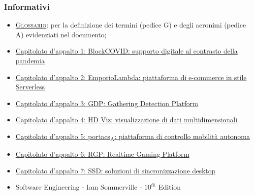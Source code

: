\subsubsection{Informativi}
\begin{itemize}
	\item \textsc{\href{https://github.com/Three-Way-Milkshake/docs/wiki/Glossario}{Glossario}}: per la definizione dei termini (pedice G) e degli acronimi (pedice A) evidenziati nel documento;
	\item \href{https://www.math.unipd.it/~tullio/IS-1/2020/Progetto/C1.pdf}{Capitolato d'appalto 1: BlockCOVID: supporto digitale al contrasto della pandemia}\\
	\item \href{https://www.math.unipd.it/~tullio/IS-1/2020/Progetto/C2.pdf}{Capitolato d'appalto 2: EmporioLambda: piattaforma di e-commerce in stile Serverless}\\
	\item \href{https://www.math.unipd.it/~tullio/IS-1/2020/Progetto/C3.pdf}{Capitolato d'appalto 3: GDP: Gathering Detection Platform}\\
	\item \href{https://www.math.unipd.it/~tullio/IS-1/2020/Progetto/C4.pdf}{Capitolato d'appalto 4: HD Viz: visualizzazione di dati multidimensionali}\\
	\item \href{https://www.math.unipd.it/~tullio/IS-1/2020/Progetto/C5.pdf}{Capitolato d'appalto 5: portacs\textsubscript{A}: piattaforma di controllo mobilità autonoma}\\
    \item \href{https://sesaspa-my.sharepoint.com/:b:/g/personal/s_dindo_vargroup_it/EThvay0f6KVCoXydYOce2lkBt-MYcnW1yafRXFXVIOIsHg?e=2emZZI}{Capitolato d'appalto 6: RGP: Realtime Gaming Platform}\\
	\item \href{https://www.math.unipd.it/~tullio/IS-1/2020/Progetto/C7.pdf}{Capitolato d'appalto 7: SSD: soluzioni di sincronizzazione desktop}\\
	\item Software Engineering - Iam Sommerville - $10^{th}$ Edition
\end{itemize}